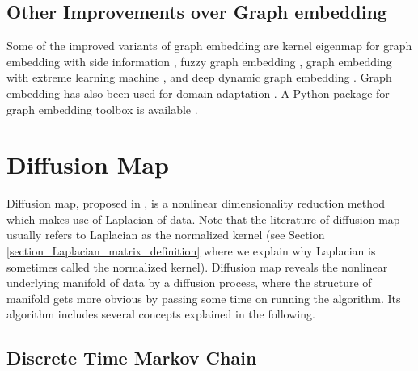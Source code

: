 \documentclass[lang=cn,10pt]{gorgeousnbook}
\numberwithin{equation}{section}%
\numberwithin{figure}{section}%
\begin{document}
\subsection{Other Improvements over Graph embedding}

Some of the improved variants of graph embedding are kernel eigenmap for graph embedding with side information \cite{brand2003continuous}, fuzzy graph embedding \cite{wan2017local}, graph embedding with extreme learning machine \cite{yang2019graph}, and deep dynamic graph embedding \cite{goyal2018dyngem,goyal2020dyngraph2vec}. Graph embedding has also been used for domain adaptation \cite{hedegaard2020supervised,hedegaard2020supervised2}. 
A Python package for graph embedding toolbox is available \cite{goyal2018gem}. 


\section{Diffusion Map}\label{section_diffusion_map}

Diffusion map, proposed in \cite{Lafon2004diffusion,coifman2005geometric,coifman2006diffusion}, is a nonlinear dimensionality reduction method which makes use of Laplacian of data. 
Note that the literature of diffusion map usually refers to Laplacian as the normalized kernel (see Section \ref{section_Laplacian_matrix_definition} where we explain why Laplacian is sometimes called the normalized kernel). 
Diffusion map reveals the nonlinear underlying manifold of data by a diffusion process, where the structure of manifold gets more obvious by passing some time on running the algorithm. Its algorithm includes several concepts explained in the following. 

\subsection{Discrete Time Markov Chain}
\end{document}
